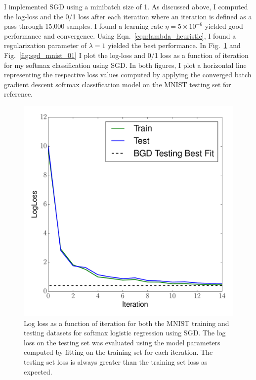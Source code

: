 \documentclass[12pt]{amsart}
\begin{document}
I implemented SGD using a minibatch size of 1.  As discussed above, I computed the log-loss and the 0/1 loss after each iteration where an iteration is defined as a pass through 15,000 samples.  I found a learning rate $\eta = 5 \times 10^{-6}$ yielded good performance and convergence.  Using Eqn.~\ref{eqn:lambda_heuristic}, I found a regularization parameter of $\lambda = 1$ yielded the best performance.  In Fig.~\ref{fig:sgd_mnist_ll} and Fig.~\ref{fig:sgd_mnist_01} I plot the log-loss and 0/1 loss as a function of iteration for my softmax classification using SGD.  In both figures, I plot a horizontal line representing the respective loss values computed by applying the converged batch gradient descent softmax classification model on the MNIST testing set for reference.

\begin{figure}[H]
	\includegraphics[width=\columnwidth]{sgd_mnist_multi_train_test_ll.pdf}
    \caption{Log loss as a function of iteration for both the MNIST training and testing datasets for softmax logistic regression using SGD.  The log loss on the testing set was evaluated using the model parameters computed by fitting on the training set for each iteration.  The testing set loss is always greater than the training set loss as expected.}
    \label{fig:sgd_mnist_ll}
\end{figure}
\end{document}
